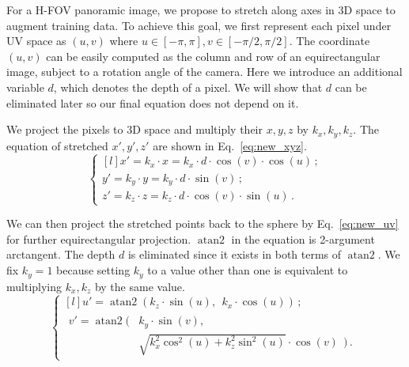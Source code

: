 \documentclass[10pt,twocolumn,letterpaper]{article}
\DeclareMathOperator{\atantwo}{atan2}
\newcommand{\threesixty}{\text{360$^\circ$}\xspace}
\begin{document}
For a \threesixty H-FOV panoramic image, we propose to stretch along axes in 3D space to augment training data. To achieve this goal, we first represent each pixel under UV space as $(u, v)$ where $u \in [-\pi, \pi], v \in [-\pi/2, \pi/2]$. The coordinate $(u, v)$ can be easily computed as the column and row of an equirectangular image, subject to a rotation angle of the camera. Here we introduce an additional variable $d$, which denotes the depth of a pixel. We will show that $d$ can be eliminated later so our final equation does not depend on it.

We project the pixels to 3D space and multiply their $x, y, z$ by $k_x, k_y, k_z$. The equation of stretched $x', y', z'$ are shown in Eq.~\ref{eq:new_xyz}.
\begin{equation} \label{eq:new_xyz}
\left\{\begin{matrix*}[l]
x' = k_x \cdot x = k_x \cdot d \cdot \cos(v) \cdot \cos(u) \,; \\ 
y' = k_y \cdot y = k_y \cdot d \cdot \sin(v) \,; \\ 
z' = k_z \cdot z = k_z \cdot d \cdot \cos(v) \cdot \sin(u) \,.
\end{matrix*}\right.
\end{equation}

We can then project the stretched points back to the sphere by Eq.~\ref{eq:new_uv} for further equirectangular projection. $\atantwo$ in the equation is 2-argument arctangent. The depth $d$ is eliminated since it exists in both terms of $\atantwo$. We fix $k_y = 1$ because setting $k_y$ to a value other than one is equivalent to multiplying $k_x, k_z$ by the same value. 
\begin{equation} \label{eq:new_uv}
\left\{\begin{matrix*}[l]
u' = \atantwo(k_z \cdot \sin(u), ~~ k_x \cdot \cos(u)) \,; \\ 
\begin{aligned}
v' = \atantwo( & k_y \cdot \sin(v), \\
               & \sqrt{k_x^2 \cos^2(u) + k_z^2 \sin^2(u)} \cdot \cos(v) ~~ ) \,.
\end{aligned}
\end{matrix*}\right.
\end{equation}
\end{document}
